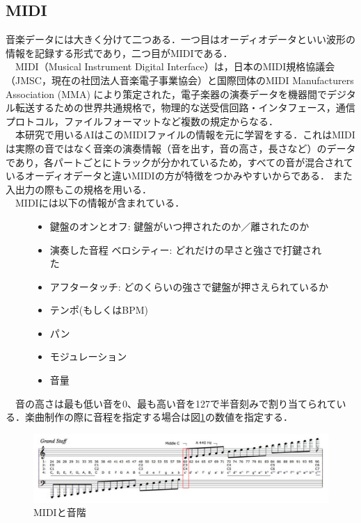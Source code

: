 \subsection{MIDI}
音楽データには大きく分けて二つある．一つ目はオーディオデータといい波形の情報を記録する形式であり，二つ目がMIDIである．\\
　MIDI（Musical Instrument Digital Interface）は，日本のMIDI規格協議会（JMSC，現在の社団法人音楽電子事業協会）と国際団体のMIDI Manufacturers Association (MMA) により策定された，電子楽器の演奏データを機器間でデジタル転送するための世界共通規格で，物理的な送受信回路・インタフェース，通信プロトコル，ファイルフォーマットなど複数の規定からなる．\\
　本研究で用いるAIはこのMIDIファイルの情報を元に学習をする．これはMIDIは実際の音ではなく音楽の演奏情報（音を出す，音の高さ，長さなど）のデータであり，各パートごとにトラックが分かれているため，すべての音が混合されているオーディオデータと違いMIDIの方が特徴をつかみやすいからである．
また入出力の際もこの規格を用いる．\\
　MIDIには以下の情報が含まれている．
\begin{figure}[h]
    \begin{screen}
    \begin{itemize}
    \item 鍵盤のオンとオフ: 鍵盤がいつ押されたのか／離されたのか
    \item 演奏した音程 ベロシティー: どれだけの早さと強さで打鍵された
    \item アフタータッチ: どのくらいの強さで鍵盤が押さえられているか
    \item テンポ(もしくはBPM)
    \item パン
    \item モジュレーション
    \item 音量
    \end{itemize}
    \end{screen}
\end{figure}
\newpage
　音の高さは最も低い音を0、最も高い音を127で半音刻みで割り当てられている．楽曲制作の際に音程を指定する場合は図\ref{fig:MIDIと音階}の数値を指定する．
\begin{figure}[h]
    \begin{screen}
    \begin{center}
        \includegraphics[scale=0.45,clip]{./img/midi2.png}
        \caption{MIDIと音階}
        \label{fig:MIDIと音階}
    \end{center}
    \end{screen}
\end{figure}
\newpage
